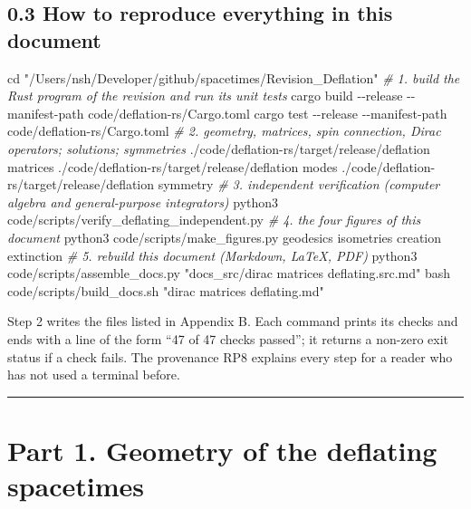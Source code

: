 \documentclass[
  10pt,
]{article}
\newenvironment{Shaded}{}{}
\newcommand{\AttributeTok}[1]{\textcolor[rgb]{0.49,0.56,0.16}{#1}}
\newcommand{\BuiltInTok}[1]{\textcolor[rgb]{0.00,0.50,0.00}{#1}}
\newcommand{\CommentTok}[1]{\textcolor[rgb]{0.38,0.63,0.69}{\textit{#1}}}
\newcommand{\ExtensionTok}[1]{#1}
\newcommand{\FunctionTok}[1]{\textcolor[rgb]{0.02,0.16,0.49}{#1}}
\newcommand{\NormalTok}[1]{#1}
\newcommand{\StringTok}[1]{\textcolor[rgb]{0.25,0.44,0.63}{#1}}
\begin{document}
\hypertarget{how-to-reproduce-everything-in-this-document}{%
\subsection{0.3 How to reproduce everything in this
document}\label{how-to-reproduce-everything-in-this-document}}

\begin{Shaded}
\begin{Highlighting}[]
\BuiltInTok{cd} \StringTok{"/Users/nsh/Developer/github/spacetimes/Revision\_Deflation"}
\CommentTok{\# 1. build the Rust program of the revision and run its unit tests}
\ExtensionTok{cargo}\NormalTok{ build }\AttributeTok{{-}{-}release} \AttributeTok{{-}{-}manifest{-}path}\NormalTok{ code/deflation{-}rs/Cargo.toml}
\ExtensionTok{cargo}\NormalTok{ test  }\AttributeTok{{-}{-}release} \AttributeTok{{-}{-}manifest{-}path}\NormalTok{ code/deflation{-}rs/Cargo.toml}
\CommentTok{\# 2. geometry, matrices, spin connection, Dirac operators; solutions; symmetries}
\ExtensionTok{./code/deflation{-}rs/target/release/deflation}\NormalTok{ matrices}
\ExtensionTok{./code/deflation{-}rs/target/release/deflation}\NormalTok{ modes}
\ExtensionTok{./code/deflation{-}rs/target/release/deflation}\NormalTok{ symmetry}
\CommentTok{\# 3. independent verification (computer algebra and general{-}purpose integrators)}
\ExtensionTok{python3}\NormalTok{ code/scripts/verify\_deflating\_independent.py}
\CommentTok{\# 4. the four figures of this document}
\ExtensionTok{python3}\NormalTok{ code/scripts/make\_figures.py geodesics isometries creation extinction}
\CommentTok{\# 5. rebuild this document (Markdown, LaTeX, PDF)}
\ExtensionTok{python3}\NormalTok{ code/scripts/assemble\_docs.py }\StringTok{"docs\_src/dirac matrices deflating.src.md"}
\FunctionTok{bash}\NormalTok{ code/scripts/build\_docs.sh }\StringTok{"dirac matrices deflating.md"}
\end{Highlighting}
\end{Shaded}

Step 2 writes the files listed in Appendix B. Each command prints its
checks and ends with a line of the form ``47 of 47 checks passed''; it
returns a non-zero exit status if a check fails. The provenance RP8
explains every step for a reader who has not used a terminal before.

\begin{center}\rule{0.5\linewidth}{0.5pt}\end{center}

\hypertarget{part-1.-geometry-of-the-deflating-spacetimes}{%
\section{Part 1. Geometry of the deflating
spacetimes}\label{part-1.-geometry-of-the-deflating-spacetimes}}
\end{document}

